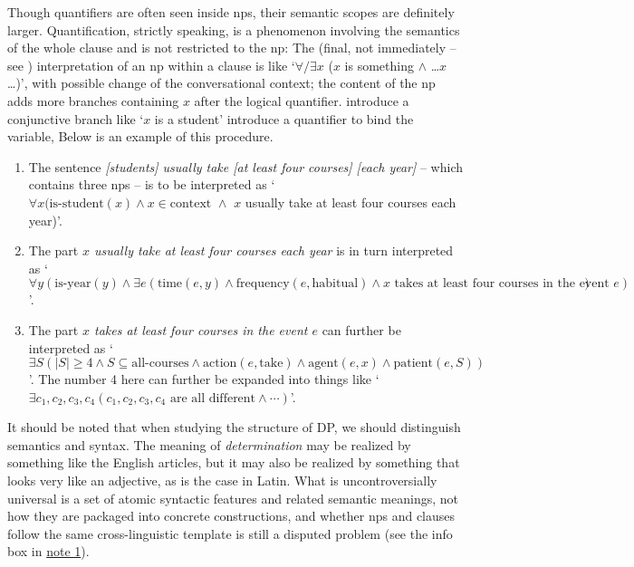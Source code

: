 \documentclass[UTF8, a4paper, oneside, scheme=plain, 12pt]{ctexbook}
\newcommand{\form}[1]{\emph{#1}}
\newcommand{\translate}[1]{`#1'}
\begin{document}
{Though quantifiers are often seen inside \acs{np}s,
their semantic scopes are definitely larger.
Quantification, strictly speaking, 
is a phenomenon involving the semantics of the whole clause 
and is not restricted to the \acs{np}:
The (final, not immediately -- see ) 
interpretation of an \acs{np} within a clause is like
\translate{$\forall/\exists x$ ($x$ is something $\land$ \dots $x$ \dots)},
with possible change of the conversational context;
the content of the \acs{np} 
adds more branches containing $x$ after the logical quantifier.
introduce a conjunctive branch like \translate{$x$ is a student}
introduce a quantifier to bind the variable,
Below is an example of this procedure.
\begin{enumerate}
    \item The sentence \form{[students] usually take [at least four courses] [each year]}
    -- which contains three \acs{np}s -- 
    is to be interpreted as 
    \translate{$\forall x (
        \text{is-student} (x) \land 
        x \in \text{context } \land$
        $x$ usually take at least four courses each year)}.
    \item The part \form{$x$ usually take at least four courses each year} 
    is in turn interpreted as 
    \translate{$\forall y (
        \text{is-year}(y) \land 
        \exists e (
            \text{time}(e, y) \land 
            \text{frequency} (e, \text{habitual}) \land 
            \text{$x$ takes at least four courses in the event $e$})
    )$}.
    \item The part \form{$x$ takes at least four courses in the event $e$} 
    can further be interpreted as 
    \translate{$
        \exists S (
            |S| \geq 4 \land 
            S \subseteq \text{all-courses} \land 
            \text{action}(e, \text{take}) \land 
            \text{agent}(e, x) \land 
            \text{patient}(e, S)
        )
    $}.
    The number 4 here can further be expanded into things like 
    \translate{$
        \exists c_1, c_2, c_3, c_4 (
            \text{$c_1, c_2, c_3, c_4$ are all different} \land 
            \cdots
        )
    $}.
\end{enumerate}

It should be noted that when studying the structure of DP,
we should distinguish semantics and syntax.
The meaning of \emph{determination} may be realized by something like the English articles,
but it may also be realized by something that looks very like an adjective,
as is the case in Latin.
What is uncontroversially universal is a set of atomic syntactic features 
and related semantic meanings, 
not how they are packaged into concrete constructions,
and whether \acs{np}s and clauses follow the same cross-linguistic template
is still a disputed problem 
(see the info box in \href{./note-1.pdf}{note 1}).

}
\end{document}
